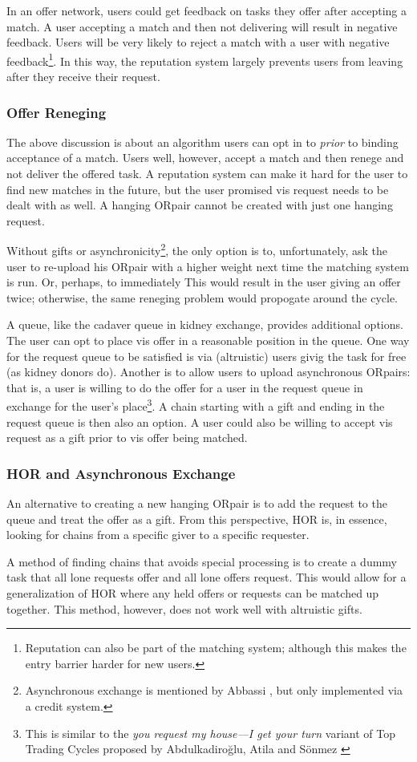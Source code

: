 \documentclass[main.tex]{subfiles}
\begin{document}
In an offer network, users could get feedback on tasks they offer after accepting a match. A user accepting a match and then not delivering will result in negative feedback. Users will be very likely to reject a match with a user with negative feedback\footnote{Reputation can also be part of the matching system; although this makes the entry barrier harder for new users.}. In this way, the reputation system largely prevents users from leaving after they receive their request.

\subsubsection{Offer Reneging}
The above discussion is about an algorithm users can opt in to \textit{prior} to binding acceptance of a match. Users well, however, accept a match and then renege and not deliver the offered task. A reputation system can make it hard for the user to find new matches in the future, but the user promised vis request needs to be dealt with as well. A hanging ORpair cannot be created with just one hanging request.

Without gifts or asynchronicity\footnote{Asynchronous exchange is mentioned by Abbassi \cite{Abb2}, but only implemented via a credit system.}, the only option is to, unfortunately, ask the user to re-upload his ORpair with a higher weight next time the matching system is run. Or, perhaps, to immediately  This would result in the user giving an offer twice; otherwise, the same reneging problem would propogate around the cycle.

A queue, like the cadaver queue in kidney exchange, provides additional options. The user can opt to place vis offer in a reasonable position in the queue. One way for the request queue to be satisfied is via (altruistic) users givig the task for free (as kidney donors do). Another is to allow users to upload asynchronous ORpairs: that is, a user is willing to do the offer for a user in the request queue in exchange for the user's place\footnote{This is similar to the \textit{you request
my house—I get your turn} variant of Top Trading Cycles proposed by Abdulkadiro{\u{g}}lu, Atila and S{\"o}nmez \cite{abd1}}. A chain starting with a gift and ending in the request queue is then also an option. A user could also be willing to accept vis request as a gift prior to vis offer being matched.

\subsubsection{HOR and Asynchronous Exchange}
An alternative to creating a new hanging ORpair is to add the request to the queue and treat the offer as a gift. From this perspective, HOR is, in essence, looking for chains from a specific giver to a specific requester.

A method of finding chains that avoids special processing is to create a dummy task that all lone requests offer and all lone offers request. This would allow for a generalization of HOR where any held offers or requests can be matched up together. This method, however, does not work well with altruistic gifts.
\end{document}
